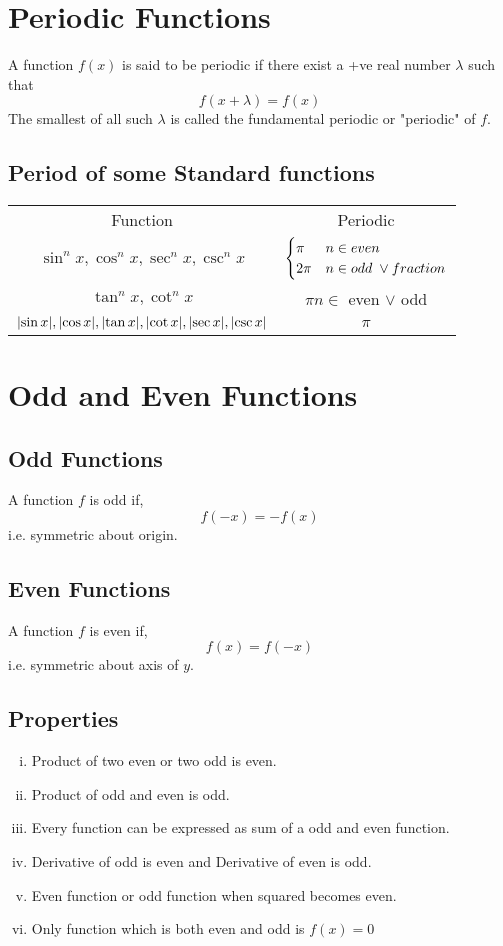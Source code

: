 \documentclass{article}
\begin{document}
\section{Periodic Functions}
A function $f(x)$ is said to be periodic if there exist a +ve real number $\lambda$ such that $$f(x+\lambda)=f(x)$$ The smallest of all such $\lambda$ is called the fundamental periodic or "periodic" of $f$.

\subsection{Period of some Standard functions}
\begin{tabular}{c c}
    Function                                     & Periodic                                      \\
    $\sin ^n x, \cos ^n x, \sec ^n x, \csc ^n x$ & $\begin{cases}
                                                            \pi  & n \in even                            \\
                                                            2\pi & n \in odd \hspace{1mm} \lor  fraction
                                                        \end{cases}$ \\
    $\tan ^n x, \cot ^n x$                       & $\pi n \in $ even $\lor$ odd                  \\
    $\abs{\sin x},\abs{\cos x}, \abs{\tan x}, \abs{\cot x}, \abs{\sec x}, \abs{\csc x}$ & $\pi$
\end{tabular}
\section{Odd and Even Functions}
\subsection*{Odd Functions}
A function $f$ is odd if, $$f(-x)=-f(x)$$ i.e. symmetric about origin.

\subsection*{Even Functions}
A function $f$ is even if, $$f(x)=f(-x)$$ i.e. symmetric about axis of $y$.

\subsection*{Properties}
\begin{enumerate}[i.]
    \item Product of two even or two odd is even.
    \item Product of odd and even is odd.
    \item Every function can be expressed as sum of a odd and even function.
    \item Derivative of odd is even and Derivative of even is odd.
    \item Even function or odd function when squared becomes even.
    \item Only function which is both even and odd is $f(x)=0$
\end{enumerate}
\end{document}
